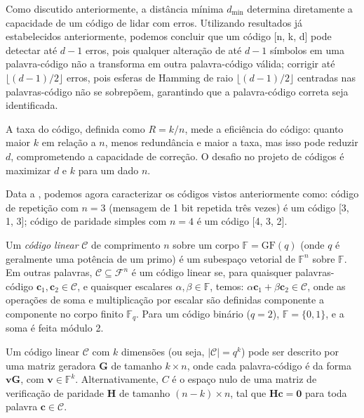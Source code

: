 Como discutido anteriormente, a distância mínima $d_{\text{min}}$ determina
diretamente a capacidade de um código de lidar com erros. 
Utilizando resultados já estabelecidos anteriormente, podemos concluir que um 
código [n, k, d] pode detectar até \( d - 1 \) erros, pois qualquer alteração de até $d - 1$ 
símbolos em uma palavra-código não a transforma em outra palavra-código válida;
corrigir até $\lfloor (d - 1)/2 \rfloor$ erros, 
pois esferas de Hamming de raio $\lfloor (d - 1)/2 \rfloor$ centradas nas palavras-código 
não se sobrepõem, garantindo que a palavra-código correta seja identificada.

A taxa do código, definida como $R = k/n$, mede a eficiência do código: 
quanto maior $k$ em relação a $n$, menos redundância e maior a taxa, 
mas isso pode reduzir $d$, comprometendo a capacidade de correção. 
O desafio no projeto de códigos é maximizar $d$ e $k$ para um dado $n$.

Data a , podemos agora caracterizar os códigos vistos anteriormente como:
código de repetição com $n=3$ (mensagem de 1 bit repetida três vezes)  é um código [3, 1, 3];
código de paridade simples com $n=4$ é um código [4, 3, 2].


\begin{definition}
Um \emph{código linear} $\mathcal{C}$ de comprimento $n$ sobre um corpo $\mathbb{F} = \text{GF}(q)$ 
(onde $q$ é geralmente uma potência de um primo) é um subespaço vetorial de $\mathbb{F}^n$ sobre $\mathbb{F}$.
Em outras palavras, $\mathcal{C} \subseteq \mathcal{F}^n$ é um código linear se, para quaisquer palavras-código 
$\mathbf{c}_1, \mathbf{c}_2 \in \mathcal{C}$, e quaisquer escalares $\alpha, \beta \in \mathbb{F}$, temos:
$\alpha \mathbf{c}_1 + \beta \mathbf{c}_2 \in \mathcal{C}$, onde as operações de soma e multiplicação por escalar 
são definidas componente a componente no corpo finito $\mathbb{F}_q$. 
Para um código binário ($q = 2$), $\mathbb{F} = \{0, 1\}$, e a soma é feita módulo 2.

Um código linear $\mathcal{C}$ com $k$ dimensões (ou seja, $|\mathcal{C}| = q^k$) pode ser descrito 
por uma matriz geradora $\mathbf{G}$ de tamanho $k \times n$, onde cada palavra-código é da forma 
$\mathbf{v} \mathbf{G}$, com $\mathbf{v} \in \mathbb{F}^k$. 
Alternativamente, $C$ é o espaço nulo de uma matriz de verificação de paridade $\mathbf{H}$ de tamanho 
$(n-k) \times n$, tal que $\mathbf{H} \mathbf{c} = \mathbf{0}$ para toda palavra $\mathbf{c} \in \mathcal{C}$.
\end{definition}


